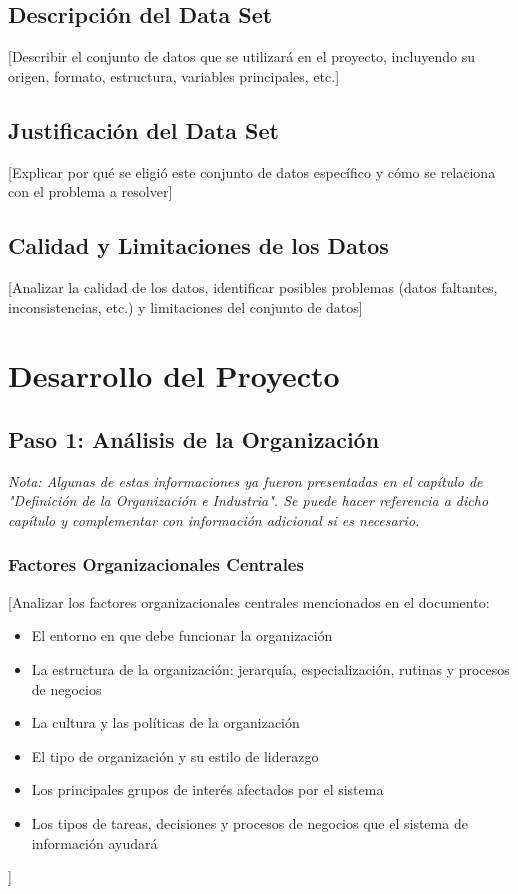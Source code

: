 \documentclass[12pt,letterpaper]{report}
\begin{document}
\section{Descripción del Data Set}
[Describir el conjunto de datos que se utilizará en el proyecto, incluyendo su origen, formato, estructura, variables principales, etc.]

\section{Justificación del Data Set}
[Explicar por qué se eligió este conjunto de datos específico y cómo se relaciona con el problema a resolver]

\section{Calidad y Limitaciones de los Datos}
[Analizar la calidad de los datos, identificar posibles problemas (datos faltantes, inconsistencias, etc.) y limitaciones del conjunto de datos]

\newpage

\chapter{Desarrollo del Proyecto}

\section{Paso 1: Análisis de la Organización}
\textit{Nota: Algunas de estas informaciones ya fueron presentadas en el capítulo de "Definición de la Organización e Industria". Se puede hacer referencia a dicho capítulo y complementar con información adicional si es necesario.}

\subsection{Factores Organizacionales Centrales}
[Analizar los factores organizacionales centrales mencionados en el documento:
\begin{itemize}
    \item El entorno en que debe funcionar la organización
    \item La estructura de la organización: jerarquía, especialización, rutinas y procesos de negocios
    \item La cultura y las políticas de la organización
    \item El tipo de organización y su estilo de liderazgo
    \item Los principales grupos de interés afectados por el sistema
    \item Los tipos de tareas, decisiones y procesos de negocios que el sistema de información ayudará
\end{itemize}]
\end{document}
